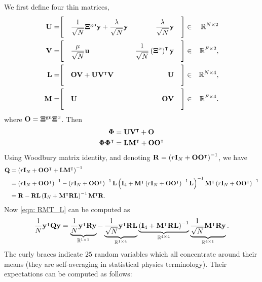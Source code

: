 \documentclass[9pt,twocolumn]{pnas-new}
\begin{document}
We first define four thin matrices,
\begin{equation}\label{eqn: 4 thin matrices}
\begin{aligned}
\mathbf{U}=&\Biggl[&&
\frac{1}{\sqrt{N}}\boldsymbol{\Xi}^{\text{gn}}\mathbf{y}+\frac{\lambda}{\sqrt{N}} \mathbf{y} &\frac{\lambda}{\sqrt{N}} \mathbf{y} &&\Biggr]&\in& \mathbb{R}^{N\times 2}\\
\mathbf{V}=&\Biggl[&&
\frac{\mu}{\sqrt{N}}\mathbf{u} & \frac{1}{\sqrt{N}}\left(\boldsymbol{\Xi}^{x}\right)^{\intercal}\mathbf{y}&&\Biggr]&\in& \mathbb{R}^{F\times 2},\\
\mathbf{L}=&\Biggl[&&
\mathbf{O}\mathbf{V}+\mathbf{U}\mathbf{V}^{\intercal}\mathbf{V} & \mathbf{U} &&\Biggr]&\in& \mathbb{R}^{N\times 4},\\
\mathbf{M}=&\Biggl[&&
\mathbf{U} &\mathbf{O}\mathbf{V} &&\Biggr]&\in& \mathbb{R}^{F\times 4}.
\end{aligned}
\end{equation}
where $\mathbf{O}=\boldsymbol{\Xi}^{\text{gn}}\boldsymbol{\Xi}^x$. Then 
\begin{equation}\label{eqn: Phi}
\begin{aligned}
\boldsymbol{\Phi}&=\mathbf{U}\mathbf{V}^\intercal+\mathbf{O}\\
\boldsymbol{\Phi}\boldsymbol{\Phi}^{\intercal}&=\mathbf{L}\mathbf{M}^{\intercal}+\mathbf{O}\mathbf{O}^{\intercal}
\end{aligned}
\end{equation}
Using Woodbury matrix identity, and denoting  $\mathbf{R}=\left(r\mathbf{I}_N+\mathbf{O}\mathbf{O}^{\intercal}\right)^{-1}$, we have
\begin{align*}
\mathbf{Q}&=\left(r\mathbf{I}_N+\mathbf{O}\mathbf{O}^{\intercal}+\mathbf{L}\mathbf{M}^{\intercal}\right)^{-1} \\ &=\left(r\mathbf{I}_N+\mathbf{O}\mathbf{O}^{\intercal}\right)^{-1}-\left(r\mathbf{I}_N+\mathbf{O}\mathbf{O}^{\intercal}\right)^{-1}\mathbf{L}\left(\mathbf{I}_4+\mathbf{M}^{\intercal}\left(r\mathbf{I}_N+\mathbf{O}\mathbf{O}^{\intercal}\right)^{-1}\mathbf{L}\right)^{-1}\mathbf{M}^{\intercal}\left(r\mathbf{I}_N+\mathbf{O}\mathbf{O}^{\intercal}\right)^{-1}\\
 & =\mathbf{R}-\mathbf{R}\mathbf{L}\left(\mathbf{I}_N+\mathbf{M}^{\intercal}\mathbf{R}\mathbf{L}\right)^{-1}\mathbf{M}^{\intercal}\mathbf{R}.
\end{align*}
Now \eqref{eqn: RMT_L} can be computed as
\begin{equation}
\frac{1}{N}\mathbf{y}^{\intercal}\mathbf{Q}\mathbf{y}  =\underbrace{\frac{1}{N}\mathbf{y}^{\intercal}\mathbf{R}\mathbf{y}}_{\mathbb{R}^{1\times1}}-\underbrace{\frac{1}{\sqrt{N}}\mathbf{y}^{\intercal}\mathbf{R}\mathbf{L}}_{\mathbb{R}^{1\times4}}\underbrace{\left(\mathbf{I}_4+\mathbf{M}^{\intercal}\mathbf{R}\mathbf{L}\right)^{-1}}_{\mathbb{R}^{4\times4}}\underbrace{\frac{1}{\sqrt{N}} \mathbf{M}^{\intercal}\mathbf{R}\mathbf{y}}_{\mathbb{R}^{4\times1}}.\label{eqn: concent 25}
 \end{equation}
The curly braces indicate $25$ random variables which all concentrate around their means (they are self-averaging in statistical physics terminology). Their expectations can be computed as follows:
\end{document}
